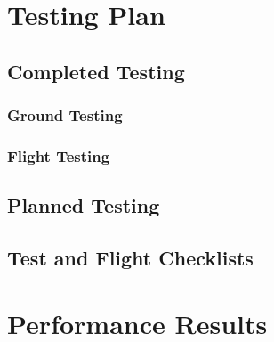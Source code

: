 \documentclass[report]{byu-aero}
\begin{document}
\section{Testing Plan} %
\label{sec:TestingPlan}


\subsection{Completed Testing}
\label{ssec:completedtesting}




\subsubsection{Ground Testing}
\label{sssec:groundtesting}



\subsubsection{Flight Testing}
\label{sssec:flighttesting}



\subsection{Planned Testing}
\label{ssec:plannedtesting}



\subsection{Test and Flight Checklists}



\section{Performance Results} %
\label{sec:PerformanceResults}
\end{document}
